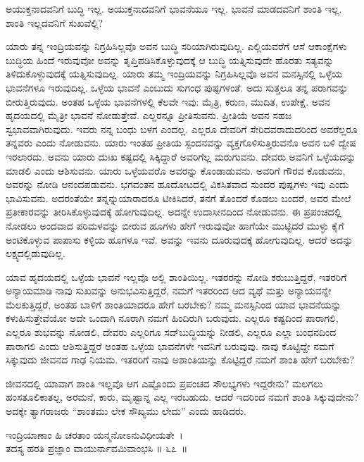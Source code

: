 \begin{artha}
ಅಯುಕ್ತನಾದವನಿಗೆ ಬುದ್ಧಿ ಇಲ್ಲ. ಅಯುಕ್ತನಾದವನಿಗೆ ಭಾವನೆಯೂ ಇಲ್ಲ. ಭಾವನೆ ಮಾಡದವನಿಗೆ ಶಾಂತಿ ಇಲ್ಲ. ಶಾಂತಿ ಇಲ್ಲದವನಿಗೆ ಸುಖವೆಲ್ಲಿ?
\end{artha}

ಯಾರು ತನ್ನ ಇಂದ್ರಿಯವನ್ನು ನಿಗ್ರಹಿಸಿಲ್ಲವೊ ಅವನ ಬುದ್ಧಿ ಸರಿಯಾಗಿರುವುದಿಲ್ಲ. ಎಲ್ಲಿಯವರೆಗೆ ಆಸೆ ಆಕಾಂಕ್ಷೆಗಳು ಬುದ್ಧಿಯ ಹಿಂದೆ ಇರುವುವೋ ಅವನ್ನು ತೃಪ್ತಿಪಡಿಸಿಕೊಳ್ಳುವುದಕ್ಕೆ ಆ ಬುದ್ಧಿ ಯತ್ನಿಸುವುದೇ ಹೊರತು ಸತ್ಯವನ್ನು ತಿಳಿದುಕೊಳ್ಳುವುದಕ್ಕೆ ಯತ್ನಿಸುವುದಿಲ್ಲ. ಯಾರು ತಮ್ಮ ಇಂದ್ರಿಯವನ್ನು ನಿಗ್ರಹಿಸಿಲ್ಲವೊ ಅವನ ಮನಸ್ಸಿನಲ್ಲಿ ಒಳ್ಳೆಯ ಭಾವನೆಗಳೂ ಇರುವುದಿಲ್ಲ. ಒಳ್ಳೆಯ ಭಾವನೆ ಎಂಬುದು ಸುಗಂಧ ಪುಷ್ಪಗಳಂತೆ. ಅದು ಸುತ್ತಲೂ ತನ್ನ ಪರಾಗವನ್ನು ಬೀರುತ್ತಿರುವುದು. ಅಂತಹ ಒಳ್ಳೆಯ ಭಾವನೆಗಳಲ್ಲಿ ಕೆಲವೇ ಇವು: ಮೈತ್ರಿ, ಕರುಣ, ಮುದಿತ, ಉಪೇಕ್ಷೆ. ಅವನ ಹೃದಯದಲ್ಲಿ ಮೈತ್ರೀ ಭಾವನೆ ನೋಡುತ್ತೇವೆ. ಎಲ್ಲರನ್ನೂ ಪ್ರೀತಿಸುವನು. ಪ್ರೀತಿಯೆ ಅವನ ಸಹಜ ಸ್ವಭಾವವಾಗಿರುವುದು. ಇವರು ನನ್ನ ಬಂಧು ಬಳಗ ಎಂದಲ್ಲ. ಎಲ್ಲರೂ ದೇವರಿಗೆ ಸೇರಿದವರಾದುದರಿಂದ ಅವರೆಲ್ಲರೂ ತನ್ನವರು ಎಂದು ನೋಡುವನು. ಯಾರು ಇಂತಹ ಪ್ರೀತಿಯ ಸ್ಪಂದನವನ್ನು ವ್ಯಕ್ತಗೊಳಿಸುತ್ತಿರುವನೊ ಅವನ ಬಳಿ ದ್ವೇಷ ಇರಲಾರದು. ಅವನು ಯಾರು ದುಃಖ ಕಷ್ಟದಲ್ಲಿ ಸಿಕ್ಕಿದ್ದಾರೆ ಅವರಿಗೆಲ್ಲ ಮರುಗುವನು. ದೇವರು ಅವನಿಗೆ ಒಳ್ಳೆಯದನ್ನು ಮಾಡಲಿ ಎಂದು ಆಶಿಸುವನು. ಯಾರು ಒಳ್ಳೆಯವರೊ ಅವರನ್ನು ಕೊಂಡಾಡುವನು. ಅವರಿಗೆ ಗೌರವ ಕೊಡುವನು, ಅವರನ್ನು ನೋಡಿ ಆನಂದಪಡುವನು. ಭಗವಂತನ ಹೂದೋಟದಲ್ಲಿ ವಿಕಸಿತವಾದ ಸುಂದರ ಪುಷ್ಪಗಳು ಇವು ಎಂದು ಭಾವಿಸುವನು. ಅದರಂತೆಯೇ ತನ್ನನ್ನು\break ಯಾರಾದರೂ ಟೀಕಿಸಿದರೆ, ತನಗೆ ತೊಂದರೆ ಕೊಡಲು ಬಂದರೆ, ಅವರ ಮೇಲೆ ಪ್ರತೀಕಾರವನ್ನು ತೀರಿಸಿಕೊಳ್ಳುವುದಕ್ಕೆ ಹೋಗುವುದಿಲ್ಲ. ಅದನ್ನೇ ಉದಾಸೀನದಿಂದ ನೋಡುವನು. ಈ ಪ್ರಪಂಚದಲ್ಲಿ ನೋಡಲು ಅಂದವಾದ ಪರಿಮಳವನ್ನು ಬೀರುವ ಹೂಗಳು ಹೇಗೆ ಇರುವುವೋ ಹಾಗೆಯೇ ಮುಟ್ಟಿದರೆ ಮುಳ್ಳು ಕೈಗೆ ಅಂಟಿಕೊಳ್ಳುವ ಪಾಪಾಸು ಕಳ್ಳಿಯ ಹೂಗಳೂ ಇವೆ. ಅವನ್ನು ಇವನು ದೂರುವುದಕ್ಕೆ ಹೋಗುವುದಿಲ್ಲ. ಆದರೆ ಅದನ್ನು ಲಕ್ಷ್ಯದಲ್ಲಿಡುವುದಿಲ್ಲ.

ಯಾವ ಹೃದಯದಲ್ಲಿ ಒಳ್ಳೆಯ ಭಾವನೆ ಇಲ್ಲವೊ ಅಲ್ಲಿ ಶಾಂತಿಯಿಲ್ಲ. ಇತರರನ್ನು ನೋಡಿ ಕರುಬುತ್ತಿದ್ದರೆ, ಇತರರಿಗೆ ಅನ್ಯಾಯಮಾಡಿ ನಾವು ಸುಖವನ್ನು ಅನುಭವಿಸುತ್ತಿದ್ದರೆ, ನಮಗೆ ಇತರರಿಂದ ಆದ ವ್ಯಥೆ ಮತ್ತು ಅನ್ಯಾಯವನ್ನೇ ಮೆಲಕುತ್ತಿದ್ದರೆ, ಅಂತಹ ಬಾಳಿಗೆ ಶಾಂತಿಯಾದರೂ ಹೇಗೆ ಬರಬೇಕು? ನಮ್ಮ ಮನಸ್ಸಿನಿಂದ ಯಾವ ಭಾವನೆಯನ್ನು ಕಳುಹಿಸುತ್ತೇವೆಯೋ ಅದೇ ಒಂದಾಗಿ ನೂರಾಗಿ ನಮಗೆ ಹಿಂದಿರುಗಿ ಬರುವುದು. ಎಲ್ಲರೂ ಕಷ್ಟದಿಂದ ಪಾರಾಗಲಿ, ಎಲ್ಲರೂ ಶುಭವನ್ನು ನೋಡಲಿ, ದೇವರು ಎಲ್ಲರಿಗೂ ಸದ್​ಬುದ್ಧಿಯನ್ನು ನೀಡಲಿ, ಎಲ್ಲರೂ ಎಲ್ಲಾ ಬಂಧನದಿಂದ ಪಾರಾಗಲಿ ಎಂದು ಆಶಿಸುತ್ತಿದ್ದರೆ ಅಂತಹ ಒಳ್ಳೆಯ ಭಾವನೆಗಳೇ ಇವನಿಗೆ ಬರುವುವು. ನಾವು ಕೊಟ್ಟಿದ್ದೇ ನಮಗೆ ಸಿಕ್ಕುವುದು ಜೀವನದ ಗಾಢ ನಿಯಮ. ಇತರರಿಗೆ ನಾವು ಅಶಾಂತಿಯನ್ನು ಕೊಟ್ಟಿದ್ದರೆ ನಮಗೆ ಶಾಂತಿ ಹೇಗೆ ಬರಬೇಕು?

ಜೀವನದಲ್ಲಿ ಯಾವಾಗ ಶಾಂತಿ ಇಲ್ಲವೊ ಆಗ ಎಷ್ಟೊಂದು ಪ್ರಪಂಚದ ಸೌಲಭ್ಯಗಳು ಇದ್ದರೇನು? ಮಲಗಲು ಹಂಸತೂಲಿಕಾತಲ್ಪ, ಅರಮನೆ, ಕಾರು, ಮೃಷ್ಟಾನ್ನ ಎಲ್ಲ ಇರಬಹುದು. ಆದರೆ ಇದರಿಂದ ನಮಗೆ ಶಾಂತಿ ಸಿಕ್ಕುವುದೇನು? ಅದಕ್ಕೇ ತ್ಯಾಗರಾಜರು “ಶಾಂತಮು ಲೇಕ ಸೌಖ್ಯಮು ಲೇದು” ಎಂದು ಹಾಡಿದರು.

\begin{shloka}
ಇಂದ್ರಿಯಾಣಾಂ ಹಿ ಚರತಾಂ ಯನ್ಮನೋಽನುವಿಧೀಯತೇ~।\\ತದಸ್ಯ ಹರತಿ ಪ್ರಜ್ಞಾಂ ವಾಯುರ್ನಾವಮಿವಾಂಭಸಿ \hfill॥ ೬೭~॥
\end{shloka}

